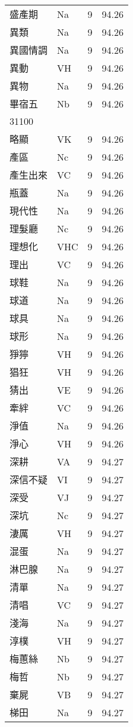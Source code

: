 \documentclass[twocolumn]{book}
\begin{document}
\begin{supertabular}{llrr}
盛產期 & Na & 9 &  94.26\\
異類 & Na & 9 &  94.26\\
異國情調 & Na & 9 &  94.26\\
異動 & VH & 9 &  94.26\\
異物 & Na & 9 &  94.26\\
畢宿五 & Nb & 9 &  94.26\\
31100\\
略顯 & VK & 9 &  94.26\\
產區 & Nc & 9 &  94.26\\
產生出來 & VC & 9 &  94.26\\
瓶蓋 & Na & 9 &  94.26\\
現代性 & Na & 9 &  94.26\\
理髮廳 & Nc & 9 &  94.26\\
理想化 & VHC & 9 &  94.26\\
理出 & VC & 9 &  94.26\\
球鞋 & Na & 9 &  94.26\\
球道 & Na & 9 &  94.26\\
球具 & Na & 9 &  94.26\\
球形 & Na & 9 &  94.26\\
猙獰 & VH & 9 &  94.26\\
猖狂 & VH & 9 &  94.26\\
猜出 & VE & 9 &  94.26\\
牽絆 & VC & 9 &  94.26\\
淨值 & Na & 9 &  94.26\\
淨心 & VH & 9 &  94.26\\
深耕 & VA & 9 &  94.27\\
深信不疑 & VI & 9 &  94.27\\
深受 & VJ & 9 &  94.27\\
深坑 & Nc & 9 &  94.27\\
淒厲 & VH & 9 &  94.27\\
混蛋 & Na & 9 &  94.27\\
淋巴腺 & Na & 9 &  94.27\\
清單 & Na & 9 &  94.27\\
清唱 & VC & 9 &  94.27\\
淺海 & Na & 9 &  94.27\\
淳樸 & VH & 9 &  94.27\\
梅蕙絲 & Nb & 9 &  94.27\\
梅哲 & Nb & 9 &  94.27\\
棄屍 & VB & 9 &  94.27\\
梯田 & Na & 9 &  94.27\\

\end{supertabular}
\end{document}
